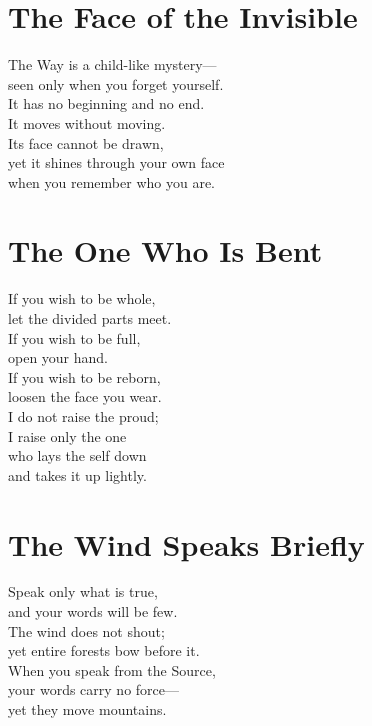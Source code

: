 \documentclass[10pt, openright]{book}
\newcommand{\sectionbreak}{\filbreak}
\newcommand{\sayingsource}[1]{\par\nopagebreak\vspace{0.3\baselineskip}{\raggedleft\footnotesize\itshape #1\par}}
\begin{document}
\section{The Face of the Invisible}\label{the-face-of-the-invisible}

The Way is a child-like mystery---\\
seen only when you forget yourself.\\
It has no beginning and no end.\\
It moves without moving.\\
Its face cannot be drawn,\\
yet it shines through your own face\\
when you remember who you are.

\sayingsource{Tao Te Ching 21}

\sectionbreak

\section{The One Who Is Bent}\label{the-one-who-is-bent}

If you wish to be whole,\\
let the divided parts meet.\\
If you wish to be full,\\
open your hand.\\
If you wish to be reborn,\\
loosen the face you wear.\\
I do not raise the proud;\\
I raise only the one\\
who lays the self down\\
and takes it up lightly.

\sayingsource{Tao Te Ching 22 · Matthew 23:12}

\sectionbreak

\section{The Wind Speaks Briefly}\label{the-wind-speaks-briefly}

Speak only what is true,\\
and your words will be few.\\
The wind does not shout;\\
yet entire forests bow before it.\\
When you speak from the Source,\\
your words carry no force---\\
yet they move mountains.
\end{document}
